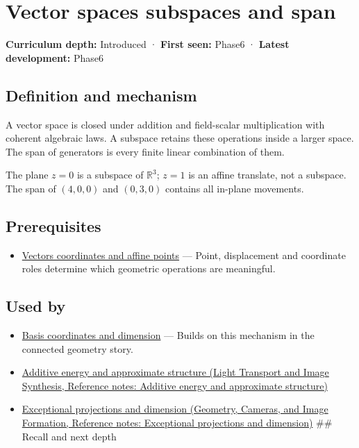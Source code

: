 \hypertarget{appendix-173b52c063ae}{}\label{referencestart:appendix-173b52c063ae}
\section{Vector spaces subspaces and span}\label{appendix-173b52c063ae-vector-spaces-subspaces-and-span}

\textbf{Curriculum depth:} Introduced · \textbf{First seen:} Phase6 · \textbf{Latest development:} Phase6

\subsection{Definition and mechanism}\label{appendix-173b52c063ae-definition-and-mechanism}

A vector space is closed under addition and field-scalar multiplication with coherent algebraic laws. A subspace retains these operations inside a larger space. The span of generators is every finite linear combination of them.

The plane \(z=0\) is a subspace of \(\mathbb R^3\); \(z=1\) is an affine translate, not a subspace. The span of \((4,0,0)\) and \((0,3,0)\) contains all in-plane movements.

\subsection{Prerequisites}\label{appendix-173b52c063ae-prerequisites}

\begin{itemize}
\tightlist
\item
  \hyperref[appendix-0659864c0aa3]{Vectors coordinates and affine points} --- Point, displacement and coordinate roles determine which geometric operations are meaningful.
\end{itemize}

\subsection{Used by}\label{appendix-173b52c063ae-used-by}

\begin{itemize}
\item
  \hyperref[appendix-ce0341f7ea0d]{Basis coordinates and dimension} --- Builds on this mechanism in the connected geometry story.
\item
  \href{../04-Light-Transport-and-Image-Synthesis/main.pdf\#nameddest=appendix-b0732b22e7d6}{Additive energy and approximate structure (Light Transport and Image Synthesis, Reference notes: Additive energy and approximate structure)}
\item
  \href{../03-Geometry-Cameras-and-Image-Formation/main.pdf\#nameddest=appendix-3c73f7862157}{Exceptional projections and dimension (Geometry, Cameras, and Image Formation, Reference notes: Exceptional projections and dimension)} \#\# Recall and next depth
\end{itemize}

